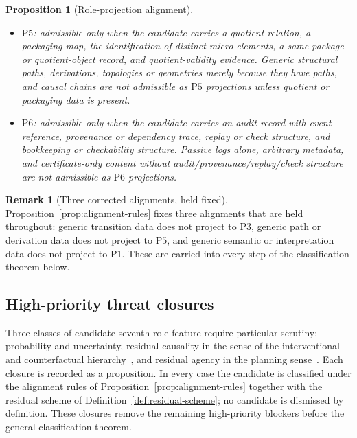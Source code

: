\documentclass[11pt]{article}
\newtheorem{proposition}[theorem]{Proposition}
\theoremstyle{definition}
\newtheorem{remark}[theorem]{Remark}
\newcommand{\Pone}{\ensuremath{\mathrm{P1}}}
\newcommand{\Pthree}{\ensuremath{\mathrm{P3}}}
\newcommand{\Pfour}{\ensuremath{\mathrm{P4}}}
\newcommand{\Pfive}{\ensuremath{\mathrm{P5}}}
\newcommand{\Psix}{\ensuremath{\mathrm{P6}}}
\begin{document}
\begin{proposition}[Role-projection alignment]
\begin{itemize}[topsep=2pt,itemsep=1pt]
    order, transition, refinement, staged-dynamics, or regime-ordering
    record with laws beyond bare labels. Bare labels, arbitrary
    relations without order, transition, or refinement law, quotient
    packaging, and audit bookkeeping are not admissible as \Pfour{}
    projections.
  \item \Pfive{}: admissible only when the candidate carries a quotient
    relation, a packaging map, the identification of distinct
    micro-elements, a same-package or quotient-object record, and
    quotient-validity evidence. Generic structural paths, derivations,
    topologies or geometries merely because they have paths, and causal
    chains are not admissible as \Pfive{} projections unless quotient
    or packaging data is present.
  \item \Psix{}: admissible only when the candidate carries an audit
    record with event reference, provenance or dependency trace, replay
    or check structure, and bookkeeping or checkability structure.
    Passive logs alone, arbitrary metadata, and certificate-only
    content without audit/provenance/replay/check structure are not
    admissible as \Psix{} projections.
\end{itemize}
\end{proposition}

\begin{remark}[Three corrected alignments, held fixed]\label{rem:three-repaired-alignments}
Proposition~\ref{prop:alignment-rules} fixes three alignments that
are held throughout: generic transition data does not project to
\Pthree{}, generic path or derivation data does not project to
\Pfive{}, and generic semantic or interpretation data does not project
to \Pone{}. These are carried into every step of the classification
theorem below.
\end{remark}

\subsection{High-priority threat closures}\label{subsec:threat-closures}

Three classes of candidate seventh-role feature require particular
scrutiny: probability and uncertainty, residual causality in the
sense of the interventional and counterfactual
hierarchy~\citep{Pearl2009}, and residual agency in the planning
sense~\citep{Bratman1987}. Each closure is recorded as a proposition.
In every case the candidate is classified under the alignment rules
of Proposition~\ref{prop:alignment-rules} together with the residual
scheme of Definition~\ref{def:residual-scheme}; no candidate is
dismissed by definition. These closures remove the remaining
high-priority blockers before the general classification theorem.
\end{document}
